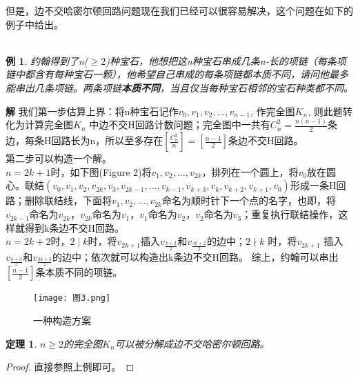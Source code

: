 \documentclass[a4paper,11pt]{book}
\newtheorem{theorem}{\textbf{定理}}[section]
\newtheorem{sample}{\textbf{例}}[section]
\begin{document}
但是，边不交哈密尔顿回路问题现在我们已经可以很容易解决，这个问题在如下的例子中给出。
\\
\\
\begin{sample} {\K 约翰得到了n($\geq 2$)种宝石，他想把这n种宝石串成几条n-长的项链（每条项链中都含有每种宝石一颗），他希望自己串成的每条项链都本质不同，请问他最多能串出几条项链。两条项链\textbf{本质不同}，当且仅当每种宝石相邻的宝石种类都不同。}\end{sample}
\textbf{解} 我们第一步估算上界：将n种宝石记作$v_0,v_1,v_2,\dots,v_{n-1}$, 作完全图$K_n$, 则此题转化为计算完全图$K_n$ 中边不交H回路计数问题；完全图中一共有$C_{n}^{2}=\frac{n(n-1)}{2}$条边，每条H回路长为n，所以至多存在$[\frac{C_n^2}{n}]=[\frac{n-1}{2}]$条边不交H回路。
\\第二步可以构造一个解。\\
$n=2k+1$时，如下图(Figure 2)将$v_1,v_2,\dots,v_{2k}$，排列在一个圆上，将$v_0$放在圆心。联结$(v_0,v_1,v_2,v_{2k},v_3,v_{2k-1},\dots,v_{k-1},v_{k+3},v_{k},v_{k+2},v_{k+1},v_0)$形成一条H回路；删除联结线，下面将$v_1,v_2,\dots,v_{2k}$命名为顺时针下一个点的名字，也即，将$v_{2k-1}$命名为$v_{2k}$，$v_{2k}$命名为$v_1$，$v_1$命名为$v_2$，$v_2$命名为$v_3$；重复执行联结操作，这样就得到k条边不交H回路。\\
$n=2k+2$时，$2\mid k$时，将$v_{2k+1}$插入$v_{\frac{k+2}{2}}$和$v_{\frac{3k+2}{2}}$的边中；$2 \nmid k$ 时，将$v_{2k+1}$ 插入$v_{\frac{k+3}{2}}$和$v_{\frac{3k+3}{2}}$的边中；依次就可以构造出k条边不交H回路。
综上，约翰可以串出$[\frac{n-1}{2}]$条本质不同的项链。
\begin{figure}[h]
 \centering
  \texttt{[image: 图3.png]}
  \caption{一种构造方案}\label{Fig.label}
\end{figure}

\begin{theorem} {\K $n\geq 2$的完全图$K_n$可以被分解成边不交哈密尔顿回路。}\end{theorem}
\begin{proof} 直接参照上例即可。 \end{proof}
\end{document}
